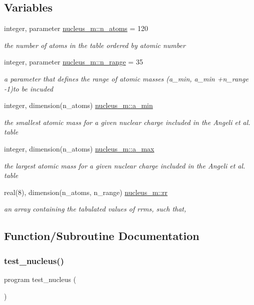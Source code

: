 \subsection*{Variables}
\begin{DoxyCompactItemize}
\item 
integer, parameter \mbox{\hyperlink{namespacenucleus__m_a97ff520812e294bf26a6b2c330f211e5}{nucleus\+\_\+m\+::n\+\_\+atoms}} = 120
\begin{DoxyCompactList}\small\item\em the number of atoms in the table ordered by atomic number \end{DoxyCompactList}\item 
integer, parameter \mbox{\hyperlink{namespacenucleus__m_adf953c9196f6870fe5e502b4f40bea48}{nucleus\+\_\+m\+::n\+\_\+range}} = 35
\begin{DoxyCompactList}\small\item\em a parameter that defines the range of atomic masses (a\+\_\+min, a\+\_\+min +n\+\_\+range -\/1)to be incuded \end{DoxyCompactList}\item 
integer, dimension(n\+\_\+atoms) \mbox{\hyperlink{namespacenucleus__m_a8541e730d34d4c5cbb0ca885c9c5cc35}{nucleus\+\_\+m\+::a\+\_\+min}}
\begin{DoxyCompactList}\small\item\em the smallest atomic mass for a given nuclear charge included in the Angeli et al. table \end{DoxyCompactList}\item 
integer, dimension(n\+\_\+atoms) \mbox{\hyperlink{namespacenucleus__m_ac8aa001386cf3938a2be5b5ec45d0c8d}{nucleus\+\_\+m\+::a\+\_\+max}}
\begin{DoxyCompactList}\small\item\em the largest atomic mass for a given nuclear charge included in the Angeli et al. table \end{DoxyCompactList}\item 
real(8), dimension(n\+\_\+atoms, n\+\_\+range) \mbox{\hyperlink{namespacenucleus__m_aadb2a0e0828722e6e3f118cdf1b07f50}{nucleus\+\_\+m\+::rr}}
\begin{DoxyCompactList}\small\item\em an array containing the tabulated values of rrms, such that, \end{DoxyCompactList}\end{DoxyCompactItemize}


\subsection{Function/\+Subroutine Documentation}
\mbox{\label{table__mod_8f90_a8ebb53a70bcfe3c94dbfbae3e3f52cba}} 
\subsubsection{\texorpdfstring{test\_nucleus()}{test\_nucleus()}}
{\footnotesize\ttfamily program test\+\_\+nucleus (\begin{DoxyParamCaption}{ }\end{DoxyParamCaption})}

